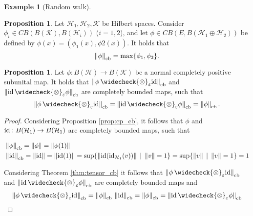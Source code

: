\documentclass[10pt,a4paper]{amsart}
\theoremstyle{definition}
\theoremstyle{definition}
\newtheorem{example}[definition]{Example}
\theoremstyle{definition}
\theoremstyle{definition}
\newtheorem{proposition}[definition]{Proposition}
\theoremstyle{definition}
\theoremstyle{definition}
\begin{document}
\begin{example}[Random walk]
\begin{proposition} \label{prop:dirsum_cb} \cite[Exercise 2.1.3.]{pisierIntroductionOperatorSpace2003}
  Let $\mathcal{H}_1, \mathcal{H}_2,  \mathcal{K} $ be Hilbert spaces.   Consider $\phi_i \in CB(B(\mathcal{K}), B(\mathcal{H}_i))$ ($i = 1,2$), and let $\phi \in 
  CB(E, B(\mathcal{H}_1 \oplus  \mathcal{H}_2))$ be defined by $\phi(x) = (\phi_1(x),  \phi2(x))$. It holds that 
  $$\left\lVert \phi \right\rVert_{\text{cb}} = \max \{ \phi_1, \phi_2 \}.$$

  
\end{proposition}

\begin{proposition} \label{prop:eqs_id_cb}
   Let $\phi: B(\mathcal{H}) \to B(\mathcal{K})$ be a normal completely positive subunital map. It holds that $\cbnorm{\phi \, \widecheck{\otimes}_\varepsilon \id}$ and $\cbnorm{\id \, \widecheck{\otimes}_\varepsilon\phi}$ are completely bounded maps, such that
  $$ 
  \cbnorm{\phi \, \widecheck{\otimes}_\varepsilon \id} = \cbnorm{\id \,\widecheck{\otimes}_\varepsilon  \phi} = \cbnorm{\phi}.
  $$
\end{proposition}

\begin{proof}
  Considering Proposition \ref{prop:cp_cb}, it follows that $\phi$ and $\mathrm{id}:B(\mathcal{H}_1) \to B(\mathcal{H}_1)$ are completely bounded maps, such that   
  
  \begin{align*}
    & \left\lVert \phi \right\rVert_{\text{cb}}=\left\lVert \phi \right\rVert=\left\lVert \phi(1) \right\rVert \\
    & \left\lVert \mathrm{id} \right\rVert_{\text{cb}} = \left\lVert \mathrm{id} \right\rVert=\left\lVert \mathrm{id}(1) \right\rVert = \sup \{\left\lVert \mathrm{id} (\mathrm{id}_{\mathcal{H}_1} (v)) \right\rVert \, \mid  \, \left\lVert v \right\rVert=1 \} = \sup \{ \left\lVert v \right\rVert \, \mid  \, \left\lVert v \right\rVert=1 \} = 1
  \end{align*}


  Considering Theorem \ref{thm:tensor_cb} it follows that  $\cbnorm{\phi \, \widecheck{\otimes}_\varepsilon \id}$ and $\cbnorm{\id \,\widecheck{\otimes}_\varepsilon \phi}$ are completely bounded maps and 
  \begin{align*}
    \cbnorm{\phi \, \widecheck{\otimes}_\varepsilon \id} = \cbnorm{\phi} \, \cbnorm{\id} = \cbnorm{\phi} =  \cbnorm{\id \, \widecheck{\otimes}_\varepsilon\phi}
  \end{align*}
\end{proof}



\end{example}
\end{document}
